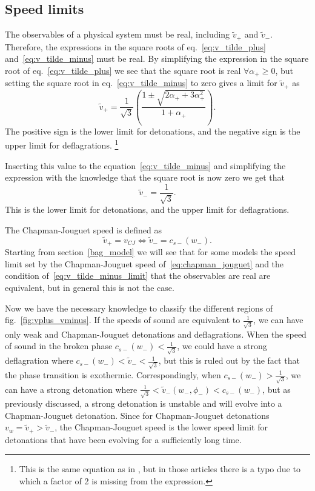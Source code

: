 \clearpage
\FloatBarrier
\subsection{Speed limits}
The observables of a physical system must be real, including $\tilde{v}_+$ and $\tilde{v}_-$.
Therefore, the expressions in the square roots of eq.~\eqref{eq:v_tilde_plus} and~\eqref{eq:v_tilde_minus} must be real.
By simplifying the expression in the square root of eq.~\eqref{eq:v_tilde_plus} we see that the square root is real $\forall \alpha_+ \geq 0$,
but setting the square root in eq.~\eqref{eq:v_tilde_minus} to zero gives a limit for $\tilde{v}_+$ as
\begin{equation}
\tilde{v}_+ = \frac{1}{\sqrt{3}} \left( \frac{1 \pm \sqrt{2 \alpha_+ + 3 \alpha_+^2}}{1 + \alpha_+} \right).
\label{eq:v_tilde_plus_limit}
\end{equation}
The positive sign is the lower limit for detonations, and the negative sign is the upper limit for deflagrations.%
\footnote{This is the same equation as in \cites[eq. 7.34]{lecture_notes}[eq. B.19]{hindmarsh_gw_pt_2019},
but in those articles there is a typo due to which a factor of 2 is missing from the expression.}

Inserting this value to the equation~\eqref{eq:v_tilde_minus} and simplifying the expression with the knowledge that the square root is now zero
we get that
\begin{equation}
\tilde{v}_- = \frac{1}{\sqrt{3}}.
\label{eq:v_tilde_minus_limit}
\end{equation}
This is the lower limit for detonations, and the upper limit for deflagrations.

The Chapman-Jouguet speed is defined as
\begin{equation}
\tilde{v}_+=v_{CJ} \Leftrightarrow \tilde{v}_- = c_{s-}(w_-).
\label{eq:chapman_jouguet}
\end{equation}
Starting from section~\eqref{bag_model} we will see that for some models the speed limit set by the Chapman-Jouguet speed of~\eqref{eq:chapman_jouguet}
and the condition of~\eqref{eq:v_tilde_minus_limit} that the observables are real are equivalent,
but in general this is not the case.

Now we have the necessary knowledge to classify the different regions of fig.~\eqref{fig:vplus_vminus}.
If the speeds of sound are equivalent to $\frac{1}{\sqrt{3}}$,
we can have only weak and Chapman-Jouguet detonations and deflagrations.
When the speed of sound in the broken phase $c_{s-}(w_-) < \frac{1}{\sqrt{3}}$,
we could have a strong deflagration where $c_{s-}(w_-) < \tilde{v}_- < \frac{1}{\sqrt{3}}$,
but this is ruled out by the fact that the phase transition is exothermic.
Correspondingly, when $c_{s-}(w_-) > \frac{1}{\sqrt{3}}$,
we can have a strong detonation where $\frac{1}{\sqrt{3}} < \tilde{v}_-(w_-, \phi_-) < c_{s-}(w_-)$,
but as previously discussed, a strong detonation is unstable and will evolve into a Chapman-Jouguet detonation.
Since for Chapman-Jouguet detonations $v_w = \tilde{v}_+ > \tilde{v}_-$,
the Chapman-Jouguet speed is the lower speed limit for detonations that have been evolving for a sufficiently long time.
